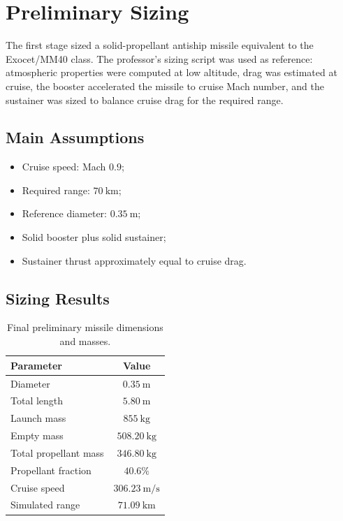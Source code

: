 \section{Preliminary Sizing}

The first stage sized a solid-propellant antiship missile equivalent to the Exocet/MM40 class. The professor's sizing script was used as reference: atmospheric properties were computed at low altitude, drag was estimated at cruise, the booster accelerated the missile to cruise Mach number, and the sustainer was sized to balance cruise drag for the required range.

\subsection{Main Assumptions}

\begin{itemize}
    \item Cruise speed: Mach \(0.9\);
    \item Required range: \(70~\text{km}\);
    \item Reference diameter: \(0.35~\text{m}\);
    \item Solid booster plus solid sustainer;
    \item Sustainer thrust approximately equal to cruise drag.
\end{itemize}

\subsection{Sizing Results}

\begin{table}[H]
\centering
\caption{Final preliminary missile dimensions and masses.}
\begin{tabular}{lc}
\toprule
Parameter & Value \\
\midrule
Diameter & \(0.35~\text{m}\) \\
Total length & \(5.80~\text{m}\) \\
Launch mass & \(855~\text{kg}\) \\
Empty mass & \(508.20~\text{kg}\) \\
Total propellant mass & \(346.80~\text{kg}\) \\
Propellant fraction & \(40.6\%\) \\
Cruise speed & \(306.23~\text{m/s}\) \\
Simulated range & \(71.09~\text{km}\) \\
\bottomrule
\end{tabular}
\end{table}

